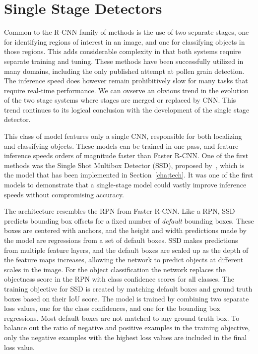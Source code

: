 \section{Single Stage Detectors}\label{sec:ssd}
Common to the R-CNN family of methods is the use of two separate stages, one for identifying regions of interest in an image, and one for classifying objects in those regions.
This adds considerable complexity in that both systems require separate training and tuning.
These methods have been successfully utilized in many domains, including the only published attempt at pollen grain detection.
The inference speed does however remain prohibitively slow for many tasks that require real-time performance.
We can ovserve an obvious trend in the evolution of the two stage systems where stages are merged or replaced by CNN\@.
This trend continues to its logical conclusion with the development of the single stage detector.

This class of model features only a single CNN, responsible for both localizing and classifying objects.
These models can be trained in one pass, and feature inference speeds orders of magnitude faster than Faster R-CNN\@.
One of the first methods was the Single Shot Multibox Detector (SSD), proposed by\ \cite{liu_ssd_2016}, which is the model that has been implemented in Section~\ref{cha:tech}.
It was one of the first models to demonstrate that a single-stage model could vastly improve inference speeds without compromising accuracy. 

The architecture resembles the RPN from Faster R-CNN\@.
Like a RPN, SSD predicts bounding box offsets for a fixed number of \textit{default} bounding boxes.
These boxes are centered with anchors, and the height and width predictions made by the model are regressions from a set of default boxes.
SSD makes predictions from multiple feature layers, and the default boxes are scaled up as the depth of the feature maps increases, allowing the network to predict objects at different scales in the image.
For the object classification the network replaces the objectness score in the RPN with class confidence scores for all classes.
The training objective for SSD is created by matching default boxes and ground truth boxes based on their IoU score.
The model is trained by combining two separate loss values, one for the class confidences, and one for the bounding box regressions.
Most default boxes are not matched to any ground truth box.
To balance out the ratio of negative and positive examples in the training objective, only the negative examples with the highest loss values are included in the final loss value.

